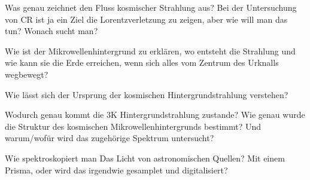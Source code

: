   \begin{frame}

  Was genau zeichnet den Fluss kosmischer Strahlung aus?
  Bei der Untersuchung von CR ist ja ein Ziel die Lorentzverletzung zu
  zeigen, aber wie will man das tun? Wonach sucht man?

  Wie ist der Mikrowellenhintergrund zu erklären, wo entsteht die Strahlung
  und wie kann sie die Erde erreichen, wenn sich alles vom Zentrum des Urknalls
  wegbewegt?

    Wie lässt sich der Ursprung der kosmischen Hintergrundstrahlung verstehen?

    Wodurch genau kommt die 3K Hintergrundstrahlung zustande? Wie genau wurde die Struktur des kosmischen Mikrowellenhintergrunds bestimmt?
    Und warum/wofür wird das zugehörige Spektrum untersucht?

  Wie spektroskopiert man Das Licht von astronomischen Quellen? Mit einem Prisma, oder wird das irgendwie gesamplet und digitalisiert?



\end{frame}
